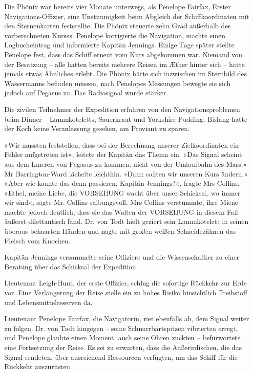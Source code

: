 \tb

Die Phönix war bereits vier Monate unterwegs, als Penelope Fairfax,
Erster Navigations-Offizier, eine Unstimmigkeit beim Abgleich der
Schiffkoordinaten mit den Sternenkarten feststellte. Die Phönix
steuerte zehn Grad außerhalb des vorberechneten Kurses. Penelope
korrigierte die Navigation, machte einen Logbucheintrag und
informierte Kapitän Jennings. Einige Tage später stellte Penelope
fest, dass das Schiff erneut vom Kurs abgekommen war. Niemand von
der Besatzung – alle hatten bereits mehrere Reisen im Æther hinter
sich – hatte jemals etwas Ähnliches erlebt. Die Phönix hätte sich
inzwischen im Sternbild des Wassermanns befinden müssen, nach
Penelopes Messungen bewegte sie sich jedoch auf Pegasus zu. Das
Radiosignal wurde stärker.

\bigpar

Die zivilen Teilnehmer der Expedition erfuhren von den
Navigationsproblemen beim Dinner – Lammkoteletts, Sauerkraut und
Yorkshire-Pudding. Bislang hatte der Koch keine Veranlassung
gesehen, am Proviant zu sparen.

»Wir mussten feststellen, dass bei der Berechnung unserer
Zielkoordinaten ein Fehler aufgetreten ist«, leitete der Kapitän
das Thema ein. »Das Signal scheint aus dem Inneren von Pegasus zu
kommen, nicht von der Umlaufbahn des Mars.« Mr Barrington-Ward
lächelte leichthin. »Dann sollten wir unseren Kurs ändern.« »Aber
wie konnte das denn passieren, Kapitän Jennings?«, fragte Mrs
Collins. »Ethel, meine Liebe, die VORSEHUNG wacht über unser
Schicksal, wo immer wir sind«, sagte Mr. Collins salbungsvoll. Mrs
Collins verstummte, ihre Miene machte jedoch deutlich, dass sie das
Walten der VORSEHUNG in diesem Fall äußerst dilettantisch fand. Dr.
von Todt hielt geziert sein Lammkotelett in seinen überaus
behaarten Händen und nagte mit großen weißen Schneidezähnen das
Fleisch vom Knochen.

\bigpar

Kapitän Jennings versammelte seine Offiziere und die
Wissenschaftler zu einer Beratung über das Schicksal der
Expedition.

Lieutenant Leigh-Hunt, der erste Offizier, schlug die sofortige
Rückkehr zur Erde vor. Eine Verlängerung der Reise stelle ein zu
hohes Risiko hinsichtlich Treibstoff und Lebensmittelreserven da.

Lieutenant Penelope Fairfax, die Navigatorin, riet ebenfalls ab,
dem Signal weiter zu folgen. Dr. von Todt hingegen – seine
Schnurrbartspitzen vibrierten erregt, und Penelope glaubte einen
Moment, auch seine Ohren zuckten – befürwortete eine Fortsetzung
der Reise. Es sei zu erwarten, dass die Außerirdischen, die das
Signal sendeten, über ausreichend Ressourcen verfügten, um das
Schiff für die Rückkehr auszurüsten.

